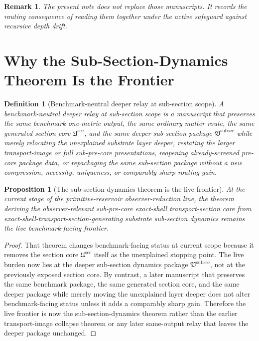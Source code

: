 \documentclass[11pt]{article}
\newcommand{\SubPreSectionCore}{\mathfrak U^{\mathrm{sec}}}
\newcommand{\SubSectionPackage}{\mathfrak V^{\mathrm{subsec}}}
\newtheorem{definition}{Definition}
\newtheorem{proposition}{Proposition}
\newtheorem{remark}{Remark}
\begin{document}
\begin{remark}
The present note does not replace those manuscripts. It records the routing consequence of reading them together under the active safeguard against recursive depth drift.
\end{remark}

\section{Why the Sub-Section-Dynamics Theorem Is the Frontier}

\begin{definition}[Benchmark-neutral deeper relay at sub-section scope]
A \emph{benchmark-neutral deeper relay at sub-section scope} is a manuscript that preserves the same benchmark one-metric output, the same ordinary matter route, the same generated section core \(\SubPreSectionCore\), and the same deeper sub-section package \(\SubSectionPackage\) while merely relocating the unexplained substrate layer deeper, restating the larger transport-image or full sub-pre-core presentations, reopening already-screened pre-core package data, or repackaging the same sub-section package without a new compression, necessity, uniqueness, or comparably sharp routing gain.
\end{definition}

\begin{proposition}[The sub-section-dynamics theorem is the live frontier]
At the current stage of the primitive-reservoir observer-reduction line, the theorem deriving the observer-relevant sub-pre-core exact-shell transport-section core from exact-shell-transport-section-generating substrate sub-section dynamics remains the live benchmark-facing frontier.
\end{proposition}

\begin{proof}
That theorem changes benchmark-facing status at current scope because it removes the section core \(\SubPreSectionCore\) itself as the unexplained stopping point. The live burden now lies at the deeper sub-section dynamics package \(\SubSectionPackage\), not at the previously exposed section core. By contrast, a later manuscript that preserves the same benchmark package, the same generated section core, and the same deeper package while merely moving the unexplained layer deeper does not alter benchmark-facing status unless it adds a comparably sharp gain. Therefore the live frontier is now the sub-section-dynamics theorem rather than the earlier transport-image collapse theorem or any later same-output relay that leaves the deeper package unchanged.
\end{proof}
\end{document}
